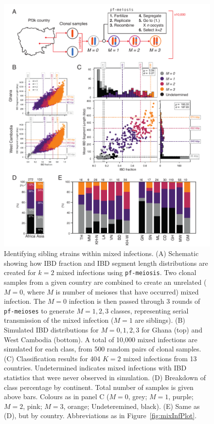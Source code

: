 \documentclass[9pt,lineno]{elife}
\begin{document}
\begin{figure}[htp]
  \begin{center}
  \includegraphics[width=\textwidth]{Fig6-v4.pdf}
   \caption{Identifying sibling strains within mixed infections.  (A) Schematic showing how IBD fraction and IBD segment length distributions are created for $k=2$ mixed infections using \texttt{pf-meiosis}. Two clonal samples from a given country are combined to create an unrelated ($M=0$, where $M$ is number of meioses that have occurred) mixed infection.  The $M=0$ infection is then passed through 3 rounds of \texttt{pf-meioses} to generate $M=1,2,3$ classes, representing serial transmission of the mixed infection ($M=1$ are siblings). (B) Simulated IBD distributions for $M=0,1,2,3$ for Ghana (top) and West Cambodia (bottom). A total of 10,000 mixed infections are simulated for each class, from 500 random pairs of clonal samples. (C) Classification results for 404 $K=2$ mixed infections from 13 countries. Undetermined indicates mixed infections with IBD statistics that were never observed in simulation. (D) Breakdown of class percentage by continent. Total number of samples is given above bars. Colours as in panel C ($M=0$, grey; $M=1$, purple; $M=2$, pink; $M=3$, orange; Undeteremined, black). (E) Same as (D), but by country. Abbreviations as in Figure~\ref{fig:mixInfPlot}.}
   \label{fig:classify}
   \end{center}
\end{figure}
\end{document}
